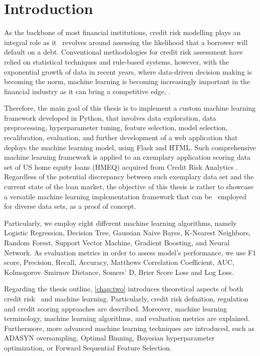 \chapter{Introduction}
\label{chap:one}

As the backbone of most financial institutions, credit risk modelling plays an integral role as it  revolves around assessing the likelihood that a borrower will default on a debt.
Conventional methodologies for credit risk assessment have relied on statistical techniques and rule-based systems, however, with the exponential growth of data in recent years, where data-driven decision making is becoming the norm, machine learning is becoming increasingly important in the financial industry as it can bring a competitive edge. \citep{PwC2023}.



Therefore, the main goal of this thesis is to implement a custom machine learning framework developed in Python, that involves data exploration, data preprocessing, hyperparameter tuning, feature selection, model selection, recalibration, evaluation, and further development of a web application that deploys the machine learning model, using Flask and HTML.
Such comprehensive machine learning framework is applied to an exemplary application scoring data set of US home equity loans (HMEQ) acquired from Credit Risk Analytics \citep{baesens2016credit}.
Regardless of the potential discrepancy between such exemplary data set and the current state of the loan market, the objective of this thesis is rather to showcase a versatile machine learning implementation framework that can be  employed for diverse data sets, as a proof of concept.



Particularly, we employ eight different machine learning algorithms, namely Logistic Regression, Decision Tree, Gaussian Naive Bayes, K-Nearest Neighbors, Random Forest, Support Vector Machine, Gradient Boosting, and Neural Network.
As evaluation metrics in order to assess model's performance, we use F1 score, Precision, Recall, Accuracy, Matthews Correlation Coefficient, AUC, Kolmogorov--Smirnov Distance, Somers' D, Brier Score Loss and Log Loss.



Regarding the thesis outline, \autoref{chap:two} introduces theoretical aspects of both credit risk  and machine learning. Particularly, credit risk definition, regulation and credit scoring approaches are described. Moreover, machine learning terminology, machine learning algorithms, and evaluation metrics are explained.
Furthermore, more advanced machine learning techniques are introduced, such as ADASYN oversampling, Optimal Binning, Bayesian hyperparameter optimization, or Forward Sequential Feature Selection.


